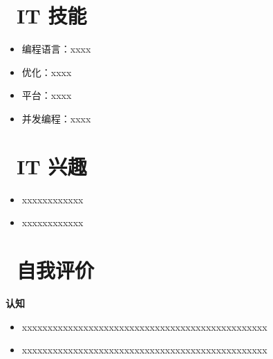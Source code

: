 \documentclass{style/resume_pic}
\begin{document}
    
    \section{\faCogs\ IT 技能 }
    \begin{itemize}[parsep=0.5ex]
      \item 编程语言：xxxx
      \item 优化：xxxx
      \item 平台：xxxx
      \item 并发编程：xxxx
    \end{itemize}
    
    \bigbreak
    
    \section{\faBug\ IT 兴趣 }
    \begin{itemize}[parsep=0.5ex]
      \item xxxxxxxxxxxx
      \item xxxxxxxxxxxx
    \end{itemize}
    
    \bigbreak
    
    \section{\faAt\ 自我评价}
    {\textbf{认知}}
    \begin{onehalfspacing}
    \begin{itemize}[parsep=0.5ex]
      \item xxxxxxxxxxxxxxxxxxxxxxxxxxxxxxxxxxxxxxxxxxxxxxxx
      \item xxxxxxxxxxxxxxxxxxxxxxxxxxxxxxxxxxxxxxxxxxxxxxxx
    \end{itemize}
    \end{onehalfspacing}
    
    
\end{document}

